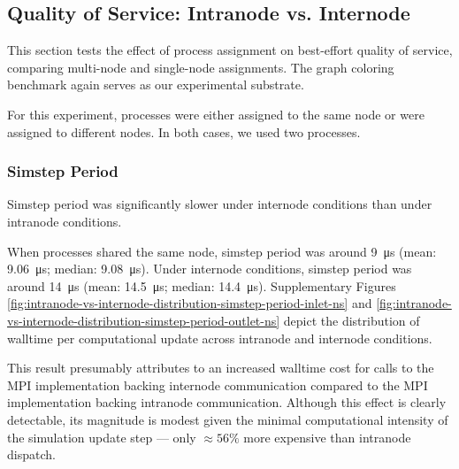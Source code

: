 \subsection{Quality of Service: Intranode vs. Internode}
\label{sec:intranode-vs-internode}



This section tests the effect of process assignment on best-effort quality of service, comparing multi-node and single-node assignments.
The graph coloring benchmark again serves as our experimental substrate.

For this experiment, processes were either assigned to the same node or were assigned to different nodes.
In both cases, we used two processes.

\subsubsection{Simstep Period}

Simstep period was significantly slower under internode conditions than under intranode conditions.

When processes shared the same node, simstep period was around \SI{9}{\micro\second} (mean: \SI{9.06}{\micro\second}; median: \SI{9.08}{\micro\second}).
Under internode conditions, simstep period was around \SI{14}{\micro\second} (mean: \SI{14.5}{\micro\second}; median: \SI{14.4}{\micro\second}).
Supplementary Figures \ref{fig:intranode-vs-internode-distribution-simstep-period-inlet-ns} and \ref{fig:intranode-vs-internode-distribution-simstep-period-outlet-ns} depict the distribution of walltime per computational update across intranode and internode conditions.

This result presumably attributes to an increased walltime cost for calls to the MPI implementation backing internode communication compared to the MPI implementation backing intranode communication.
Although this effect is clearly detectable, its magnitude is modest given the minimal computational intensity of the simulation update step --- only $\approx 56\%$ more expensive than intranode dispatch.

